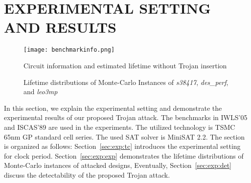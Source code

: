 \section{EXPERIMENTAL SETTING AND RESULTS}
\label{sec:mot}
\begin{figure*}
	\centering
	\texttt{[image: benchmarkinfo.png]}
	\caption{Circuit information and estimated lifetime without Trojan insertion}
	\label{fig:benchmark}
\end{figure*}

\begin{figure*}[!ht]
    \centering
    \hspace{0.1cm}
    \hspace{0.1cm}
    \hspace{0.1cm}
    \caption{Lifetime distributions of Monte-Carlo Instances of \textit{s38417}, \textit{des\_perf}, and \textit{leo3mp}}
    \label{fig:exp}
\end{figure*}


In this section, we explain the experimental setting and demonstrate the experimental results of our proposed Trojan attack. The benchmarks in IWLS'05 and ISCAS'89 are used in the experiments. The utilized technology is TSMC 65nm GP standard cell series. The used SAT solver is MiniSAT 2.2. The section is organized as follows: Section~\ref{sec:exp:tc} introduces the experimental setting for clock period. Section~\ref{sec:exp:exp} demonstrates the lifetime distributions of Monte-Carlo instances of attacked designs, Eventually, Section~\ref{sec:exp:det} discuss the detectability of the proposed Trojan attack.  

